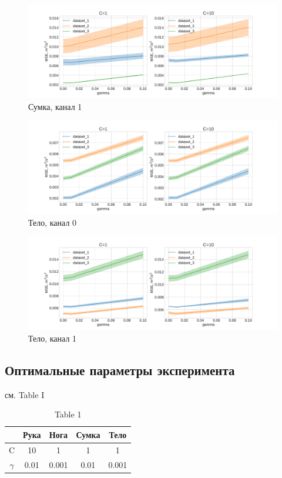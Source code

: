 \documentclass[letterpaper, 10 pt, conference]{ieeeconf}  %
\begin{document}
    \begin{figure}[H]
    \includegraphics[scale=0.2]{charts/bag_chn1_C=10.pdf}
    \caption{Сумка, канал 1}
    \label{fig:image}
    \end{figure}
    
    \begin{figure}[H]
    \includegraphics[scale=0.2]{charts/body_chn0_C=10.pdf}
    \caption{Тело, канал 0}
    \label{fig:image}
    \end{figure}
    
    \begin{figure}[H]
    \includegraphics[scale=0.2]{charts/body_chn1_C=10.pdf}
    \caption{Тело, канал 1}
    \label{fig:image}
    \end{figure}

\subsection{Оптимальные параметры эксперимента}
см. Table I
\begin{table}[H]
\caption{Table 1}
\begin{center}
\begin{tabular}{|c|c|c|c|c|}
\hline
& Рука & Нога & Сумка & Тело \\
\hline
C & 10 & 1 & 1 & 1 \\
\hline
$\gamma$ & 0.01 & 0.001 & 0.01 & 0.001\\
\hline
\end{tabular}
\end{center}
\end{table} 
\end{document}

